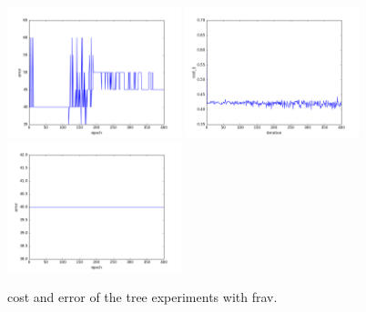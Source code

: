 \begin{figure}[htb]
\includegraphics[width=0.45\textwidth]{images/redes/ejecucion1/general_svm_frav/minidataset_tested_itself/error.png}
\includegraphics[width=0.45\textwidth]{images/redes/ejecucion1/general_svm_frav/minidataset_tested_iteself_lr_0_001/cost.png}
\includegraphics[width=0.45\textwidth]{images/redes/ejecucion1/general_svm_frav/minidataset_tested_iteself_lr_0_001/error.png}
\caption{cost and error of the tree experiments with frav.} \label{fig:frav-ejec1}
\end{figure}

